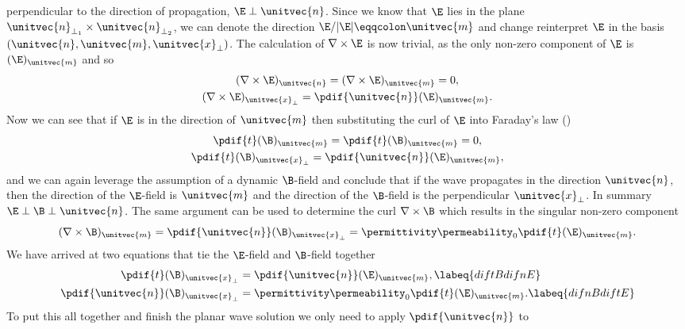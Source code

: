     perpendicular to the direction of propagation, \(\E \perp \unitvec{n}\).
Since we know that \(\E\) lies in the plane \(\unitvec{n}_{\perp_1} \times \unitvec{n}_{\perp_2}\), we can denote the
    direction \({\E/|\E| \eqqcolon\unitvec{m}}\) and change reinterpret \(\E\) in the basis 
    \((\unitvec{n}, \unitvec{m}, \unitvec{x}_{\perp})\).
The calculation of \(\nabla \times \E\) is now trivial, as the only non-zero component of \(\E\) is 
    \((\E)_{\unitvec{m}}\) and so
    \begin{gather*}
        (\nabla\times\E)_{\unitvec{n}}  =  (\nabla\times\E)_{\unitvec{m}} = 0,\\
        (\nabla\times\E)_{\unitvec{x}_{\perp}}  =  \pdif{\unitvec{n}}(\E)_{\unitvec{m}}.
    \end{gather*}
Now we can see that if \(\E\) is in the direction of \(\unitvec{m}\) then substituting the curl of \(\E\) into Faraday's
    law ()
    \begin{gather*}
        \pdif{t} (\B)_{\unitvec{m}} =  \pdif{t} (\B)_{\unitvec{m}} = 0, \\
        \pdif{t} (\B)_{\unitvec{x}_{\perp}} =  \pdif{\unitvec{n}} (\E)_{\unitvec{m}}, \\
    \end{gather*}
    and we can again leverage the assumption of a dynamic \(\B\)-field and conclude that if the wave propagates in the
    direction \(\unitvec{n}\), then the direction of the \(\E\)-field is \(\unitvec{m}\) and the direction of the
    \(\B\)-field is the perpendicular \(\unitvec{x}_{\perp}\).
In summary \(\E \perp \B \perp \unitvec{n}\).
The same argument can be used to determine the curl \(\nabla \times \B\) which results in the singular non-zero
    component 
    \begin{equation*}
        (\nabla \times \B)_{\unitvec{m}} = \pdif{\unitvec{n}}(\B)_{\unitvec{x}_{\perp}} = \permittivity\permeability_0
        \pdif{t}(\E)_{\unitvec{m}}.
    \end{equation*}
We have arrived at two equations that tie the \(\E\)-field and \(\B\)-field together
    \begin{align}
        \pdif{t} (\B)_{\unitvec{x}_{\perp}} &=  \pdif{\unitvec{n}} (\E)_{\unitvec{m}},\labeq{diftBdifnE} \\
        \pdif{\unitvec{n}}(\B)_{\unitvec{x}_{\perp}} &= \permittivity\permeability_0 \pdif{t}(\E)_{\unitvec{m}}.
        \labeq{difnBdiftE}
    \end{align}
To put this all together and finish the planar wave solution we only need to apply \(\pdif{\unitvec{n}}\) to 
